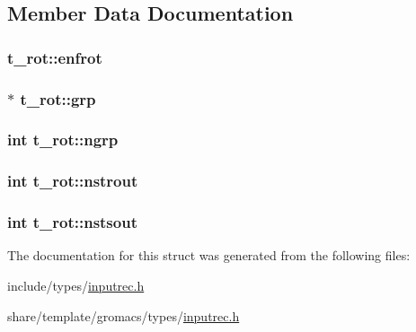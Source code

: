 \subsection{\-Member \-Data \-Documentation}
\hypertarget{structt__rot_a62540f0817b4b5e8ec729ce62acb46ad}{
\subsubsection[{enfrot}]{ {\bf t\-\_\-rot\-::enfrot}}}\label{structt__rot_a62540f0817b4b5e8ec729ce62acb46ad}
\hypertarget{structt__rot_a39a14f527d58a2b2541e6f7138cce248}{
\subsubsection[{grp}]{ $\ast$ {\bf t\-\_\-rot\-::grp}}}\label{structt__rot_a39a14f527d58a2b2541e6f7138cce248}
\hypertarget{structt__rot_abaeb9baacc26e365ee1a7e5ebd71fa52}{
\subsubsection[{ngrp}]{\setlength{\rightskip}{0pt plus 5cm}int {\bf t\-\_\-rot\-::ngrp}}}\label{structt__rot_abaeb9baacc26e365ee1a7e5ebd71fa52}
\hypertarget{structt__rot_aa204c4d3663b7256bb59f665382ca36a}{
\subsubsection[{nstrout}]{\setlength{\rightskip}{0pt plus 5cm}int {\bf t\-\_\-rot\-::nstrout}}}\label{structt__rot_aa204c4d3663b7256bb59f665382ca36a}
\hypertarget{structt__rot_ac5324149ef4f692fd449adfebd8aff8e}{
\subsubsection[{nstsout}]{\setlength{\rightskip}{0pt plus 5cm}int {\bf t\-\_\-rot\-::nstsout}}}\label{structt__rot_ac5324149ef4f692fd449adfebd8aff8e}


\-The documentation for this struct was generated from the following files\-:\begin{DoxyCompactItemize}
\item 
include/types/\hyperlink{include_2types_2inputrec_8h}{inputrec.\-h}\item 
share/template/gromacs/types/\hyperlink{share_2template_2gromacs_2types_2inputrec_8h}{inputrec.\-h}\end{DoxyCompactItemize}
